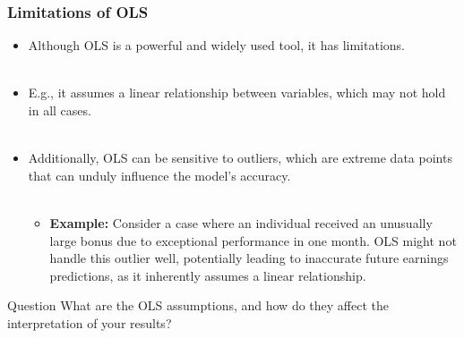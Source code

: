 \documentclass[notes,10pt, aspectratio=169]{beamer}
\begin{document}
\begin{frame}
\frametitle{Limitations of OLS}
\begin{itemize}
    \item Although OLS is a powerful and widely used tool, it has limitations.\\\\[1em]
    \item E.g., it assumes a linear relationship between variables, which may not hold in all cases.\\\\[1em]
    \item Additionally, OLS can be sensitive to outliers, which are extreme data points that can unduly influence the model's accuracy.\\\\[1em]
 \begin{itemize}
        \item \textbf{Example:} Consider a case where an individual received an unusually large bonus due to exceptional performance in one month. OLS might not handle this outlier well, potentially leading to inaccurate future earnings predictions, as it inherently assumes a linear relationship.
    \end{itemize}
\end{itemize}

\begin{exampleblock}{Question}
 What are the OLS assumptions, and how do they affect the interpretation of your results?
\end{exampleblock}

\end{frame}
\end{document}
